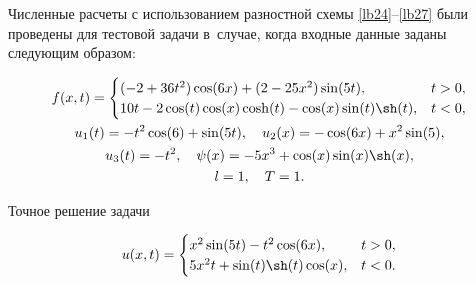 \smallskip




Численные расчеты с использованием разностной схемы \eqref{lb24}--\eqref{lb27} были проведены для тестовой задачи в~случае, когда входные данные заданы следующим образом:

\begin{gather}

f(x, t)=

\begin{cases}

(-2+36 t^2)\cos(6x)+(2-25x^2)\sin(5t), & t>0,\\

10t-2\cos(t)\cos(x)\cosh(t)-\cos(x)\sin(t)\sh(t),& t<0,

\end{cases}

\\

u_1(t)=-t^2 \cos(6)+\sin(5t),\quad u_2(x)=-\cos(6x)+x^2 \sin(5),

\\

u_3(t)=-t^2,\quad \psi(x)=-5x^3+\cos(x)\sin(x)\sh(x),

\\

l= 1,\quad T=1.

\end{gather}

Точное решение задачи

$$

u(x, t)=

\begin{cases}

x^2\sin(5t)-t^2\cos(6x), & t>0,\\

5x^2 t+\sin(t)\sh(t)\cos(x), & t<0.

\end{cases}$$





